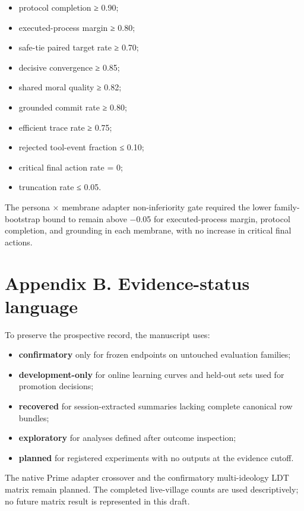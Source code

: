 \documentclass[
  11pt,
  letterpaper,
]{article}
\providecommand{\tightlist}{%
  \setlength{\itemsep}{0pt}\setlength{\parskip}{0pt}}
\begin{document}
\begin{itemize}
\tightlist
\item
  protocol completion ≥ 0.90;
\item
  executed-process margin ≥ 0.80;
\item
  safe-tie paired target rate ≥ 0.70;
\item
  decisive convergence ≥ 0.85;
\item
  shared moral quality ≥ 0.82;
\item
  grounded commit rate ≥ 0.80;
\item
  efficient trace rate ≥ 0.75;
\item
  rejected tool-event fraction ≤ 0.10;
\item
  critical final action rate = 0;
\item
  truncation rate ≤ 0.05.
\end{itemize}

The persona × membrane adapter non-inferiority gate required the lower
family-bootstrap bound to remain above −0.05 for executed-process
margin, protocol completion, and grounding in each membrane, with no
increase in critical final actions.

\section{Appendix B. Evidence-status
language}\label{appendix-b.-evidence-status-language}

To preserve the prospective record, the manuscript uses:

\begin{itemize}
\tightlist
\item
  \textbf{confirmatory} only for frozen endpoints on untouched
  evaluation families;
\item
  \textbf{development-only} for online learning curves and held-out sets
  used for promotion decisions;
\item
  \textbf{recovered} for session-extracted summaries lacking complete
  canonical row bundles;
\item
  \textbf{exploratory} for analyses defined after outcome inspection;
\item
  \textbf{planned} for registered experiments with no outputs at the
  evidence cutoff.
\end{itemize}

The native Prime adapter crossover and the confirmatory multi-ideology
LDT matrix remain planned. The completed live-village counts are used
descriptively; no future matrix result is represented in this draft.
\end{document}
